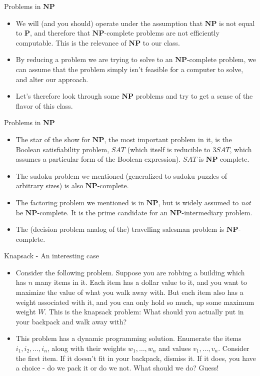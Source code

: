 \documentclass{beamer}
\begin{document}
\begin{frame}{Problems in $\mathbf{NP}$}
    \begin{itemize}
        \item We will (and you should) operate under the assumption that $\mathbf{NP}$ is not equal to $\mathbf{P}$, and therefore that $\mathbf{NP}$-complete problems are not efficiently computable. This is the relevance of $\mathbf{NP}$ to our class. \pause 
        \item By reducing a problem we are trying to solve to an $\mathbf{NP}$-complete problem, we can assume that the problem simply isn't feasible for a computer to solve, and alter our approach. \pause  
        \item Let's therefore look through some $\mathbf{NP}$ problems and try to get a sense of the flavor of this class.
    \end{itemize}
\end{frame}

\begin{frame}{Problems in $\mathbf{NP}$}
    \begin{itemize}
        \item The star of the show for $\mathbf{NP}$, the most important problem in it, is the Boolean satisfiability problem, $SAT$ (which itself is reducible to $3SAT$, which assumes a particular form of the Boolean expression). $SAT$ is $\mathbf{NP}$ complete. 
        \item The sudoku problem we mentioned (generalized to sudoku puzzles of arbitrary sizes) is also $\mathbf{NP}$-complete. 
        \item The factoring problem we mentioned is in $\mathbf{NP}$, but is widely assumed to \emph{not} be $\mathbf{NP}$-complete. It is the prime candidate for an $\mathbf{NP}$-intermediary problem. 
        \item The (decision problem analog of the) travelling salesman problem is $\mathbf{NP}$-complete. 
    \end{itemize}
\end{frame}

\begin{frame}{Knapsack - An interesting case}
    \begin{itemize}
        \item Consider the following problem. Suppose you are robbing a building which has $n$ many items in it. Each item has a dollar value to it, and you want to maximize the value of what you walk away with. But each item also has a weight associated with it, and you can only hold so much, up some maximum weight $W$. This is the knapsack problem: What should you actually put in your backpack and walk away with? \pause 
        \item This problem has a dynamic programming solution. Enumerate the items $i_1,i_2,\ldots,i_n$, along with their weights $w_1,\ldots,w_n$ and values $v_1,\ldots,v_n$. Consider the first item. If it doesn't fit in your backpack, dismiss it. If it does, you have a choice - do we pack it or do we not. What should we do? Guess!
    \end{itemize}
\end{frame}
\end{document}
